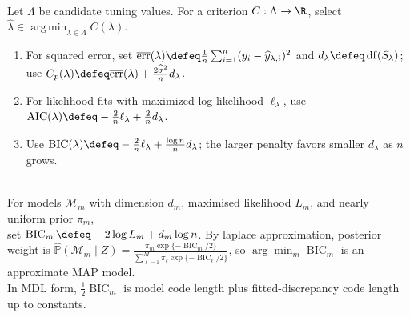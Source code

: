 \begin{method} \label{meth:sl-aic-bic-effective-df-selection} \\
Let $\Lambda$ be candidate tuning values. For a criterion $C:\Lambda\to\R$, select $\widehat{\lambda}\in\operatorname*{arg\,min}_{\lambda\in\Lambda}C(\lambda)$.
\begin{enumerate}[label=(\roman*)]
\setlength{\itemsep}{0pt}
\item For squared error, set $\overline{\operatorname{err}}(\lambda)\defeq \frac{1}{n}\sum_{i=1}^n(y_i-\widehat{y}_{\lambda,i})^2$ and $d_\lambda\defeq\operatorname{df}(S_\lambda)$; use $C_p(\lambda)\defeq\overline{\operatorname{err}}(\lambda)+\frac{2\widehat{\sigma}^2}{n}d_\lambda$.
\item For likelihood fits with maximized log-likelihood $\ell_\lambda$, use $\operatorname{AIC}(\lambda)\defeq-\frac{2}{n}\ell_\lambda+\frac{2}{n}d_\lambda$.
\item Use $\operatorname{BIC}(\lambda)\defeq-\frac{2}{n}\ell_\lambda+\frac{\log n}{n}d_\lambda$; the larger penalty favors smaller $d_\lambda$ as $n$ grows.
\end{enumerate}
\end{method}

\begin{remark} \label{rem:sl-bic-bayesian-mdl-view} \\
For models $\mathcal{M}_m$ with dimension $d_m$, maximised likelihood $L_m$, and nearly uniform prior $\pi_m$,\\
set $\operatorname{BIC}_m\defeq-2\log L_m+d_m\log n$. By laplace approximation, posterior weight is $\widehat{\mathbb{P}}(\mathcal{M}_m\mid Z)=\frac{\pi_m\exp\{-\operatorname{BIC}_m/2\}}{\sum_{\ell=1}^M\pi_\ell\exp\{-\operatorname{BIC}_\ell/2\}}$, so $\arg\min_m\operatorname{BIC}_m$ is an approximate MAP model.\\
In MDL form, $\frac12\operatorname{BIC}_m$ is model code length plus fitted-discrepancy code length up to constants.
\end{remark}

